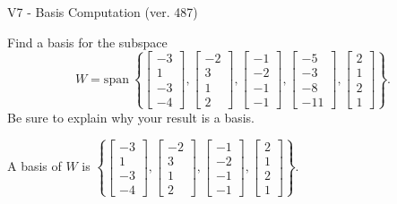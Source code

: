 \begin{exercise}
  \begin{exerciseTitle}V7 - Basis Computation (ver. 487)\end{exerciseTitle}
  \begin{exerciseStatement}
    Find a basis for the subspace 
\[W=\mathrm{span}\ \left\{\left[\begin{array}{r}
-3 \\
1 \\
-3 \\
-4
\end{array}\right] , \left[\begin{array}{r}
-2 \\
3 \\
1 \\
2
\end{array}\right] , \left[\begin{array}{r}
-1 \\
-2 \\
-1 \\
-1
\end{array}\right] , \left[\begin{array}{r}
-5 \\
-3 \\
-8 \\
-11
\end{array}\right] , \left[\begin{array}{r}
2 \\
1 \\
2 \\
1
\end{array}\right]\right\}.\]
 Be sure to explain why your result is a basis.


  \end{exerciseStatement}
  \begin{exerciseAnswer}
   A basis of \(W\) is  \(\left\{\left[\begin{array}{r}
-3 \\
1 \\
-3 \\
-4
\end{array}\right] , \left[\begin{array}{r}
-2 \\
3 \\
1 \\
2
\end{array}\right] , \left[\begin{array}{r}
-1 \\
-2 \\
-1 \\
-1
\end{array}\right] , \left[\begin{array}{r}
2 \\
1 \\
2 \\
1
\end{array}\right]\right\}\).
  


  \end{exerciseAnswer}
\end{exercise}